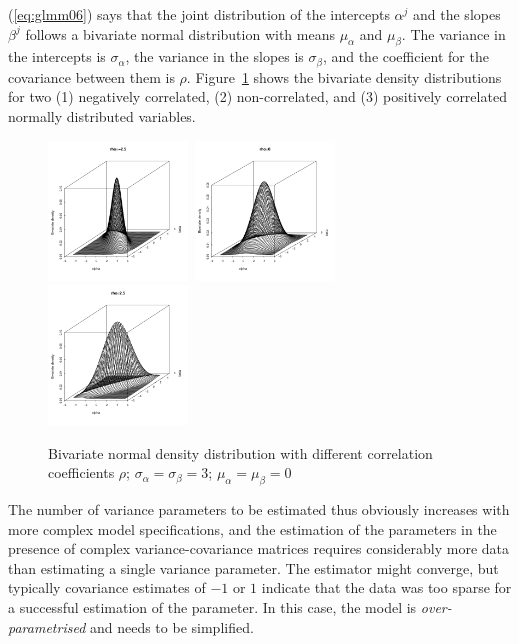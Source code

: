 \documentclass[a4paper,12pt]{article}
\begin{document}
(\ref{eq:glmm06}) says that the joint distribution of the intercepts $\alpha^j$ and the slopes $\beta^j$ follows a bivariate normal distribution with means $\mu_{\alpha}$ and $\mu_{\beta}$.
The variance in the intercepts is $\sigma_{\alpha}$, the variance in the slopes is $\sigma_{\beta}$, and the coefficient for the covariance between them is $\rho$.
Figure~\ref{fig:multnorm} shows the bivariate density distributions for two (1) negatively correlated, (2) non-correlated, and (3) positively correlated normally distributed variables.

\begin{figure}[!htpb]
  \centering
  \includegraphics[width=0.33\textwidth]{graphics/multnorm1}~\includegraphics[width=0.33\textwidth]{graphics/multnorm2}~\includegraphics[width=0.33\textwidth]{graphics/multnorm3}
  \caption{Bivariate normal density distribution with different correlation coefficients $\rho$; $\sigma_{\alpha}=\sigma_{\beta}=3$; $\mu_{\alpha}=\mu_{\beta}=0$}
  \label{fig:multnorm}
\end{figure}

The number of variance parameters to be estimated thus obviously increases with more complex model specifications, and the estimation of the parameters in the presence of complex variance-covariance matrices requires considerably more data than estimating a single variance parameter.
The estimator might converge, but typically covariance estimates of $-1$ or $1$ indicate that the data was too sparse for a successful estimation of the parameter.
In this case, the model is \textit{over-parametrised} and needs to be simplified.
\end{document}
